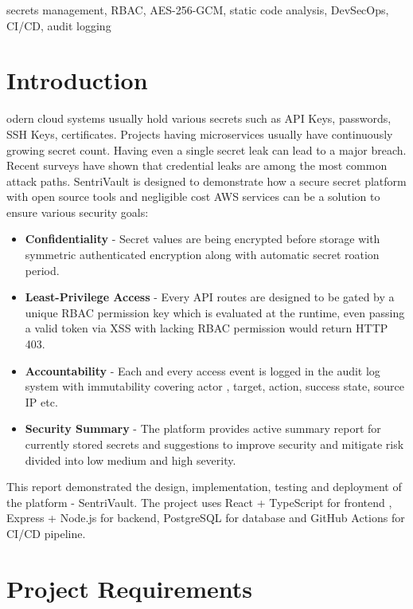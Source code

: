 \documentclass[conference]{IEEEtran}
\begin{document}
\begin{IEEEkeywords}
secrets management, RBAC, AES-256-GCM, static code analysis, DevSecOps, CI/CD, audit logging
\end{IEEEkeywords}

\section{Introduction}
\label{sec:intro}

\lettrine[findent=2pt]{}{ }odern cloud systems usually hold various secrets such as API Keys, passwords, SSH Keys, certificates. Projects having microservices usually have continuously growing secret count. Having even a single secret leak can lead to a major breach. Recent surveys have shown that credential leaks are among the most common attack paths. SentriVault is designed to demonstrate how a secure secret platform with open source tools and negligible cost AWS services can be a solution to ensure various security goals:

\begin{itemize}
    \item \textbf {Confidentiality} - Secret values are being encrypted before storage with symmetric authenticated encryption along with automatic secret roation period.
    \item \textbf {Least-Privilege Access} - Every API routes are designed to be gated by a unique RBAC permission key which is evaluated at the runtime, even passing a valid token via XSS with lacking RBAC permission would return HTTP 403.
    \item \textbf {Accountability} - Each and every access event is logged in the audit log system with immutability covering actor , target, action, success state, source IP etc.
    \item \textbf {Security Summary} - The platform provides active summary report for currently stored secrets and suggestions to improve security and mitigate risk divided into low medium and high severity.
\end{itemize}


This report demonstrated the design, implementation, testing and deployment of the platform - SentriVault. The project uses React + TypeScript for frontend , Express + Node.js for backend, PostgreSQL for database and GitHub Actions for CI/CD pipeline.


\section{Project Requirements}
\label{sec:requirements}
\end{document}
